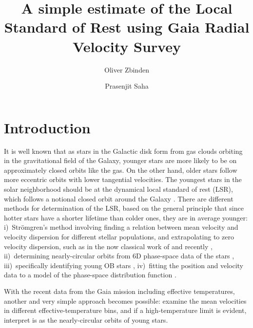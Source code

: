 \documentclass{aastex62}
\begin{document}
	
\title{A simple estimate of the Local Standard of Rest using Gaia Radial Velocity Survey}
	
	
	\author{Oliver Zbinden}
	
	
	\author{Prasenjit Saha}

	
\section{Introduction}\label{intro}
	
It is well known that as stars in the Galactic disk form from gas clouds orbiting in the gravitational field of the Galaxy, younger stars are more likely to be on approximately closed orbits like the gas. On the other hand, older stars follow more eccentric orbits with lower tangential velocities.  The youngest stars in the solar neighborhood should be at the dynamical local standard of rest (LSR), which follows a notional closed orbit around the Galaxy \citep[see e.g.,][]{shu,tayler,keel}.  There are different methods for determination of the LSR, based on the general principle that since hotter stars have a shorter lifetime than colder ones, they are in average younger:  i)~Str\"omgren's method involving finding a relation between mean velocity and velocity dispersion for different stellar populations, and extrapolating to zero velocity dispersion, such as in the now classical work of \cite{delhaye} and recently \cite{ding}, ii)~determining nearly-circular orbits from 6D phase-space data of the stars \citep{francis}, iii)~specifically identifying young OB stars \citep{boby}, iv)~fitting the position and velocity data to a model of the phase-space distribution function \citep{schoenrich}.

With the recent data from the Gaia mission including effective temperatures, another and very simple approach becomes possible: examine the mean velocities in different effective-temperature bins, and if a high-temperature limit is evident, interpret is as the nearly-circular orbits of young stars.
	
\end{document}
